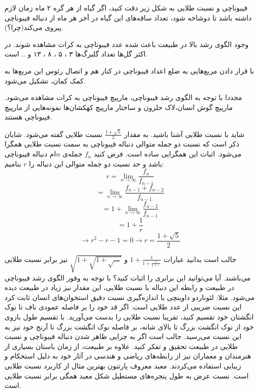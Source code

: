 \begin{EXTRA}{فیبوناچی و نسبت طلایی}
    \p
    به شکل زیر دقت کنید، اگر گیاه از هر گره ۲ ماه زمان لازم داشته باشد تا دوشاخه شود، تعداد ساقه‌های این گیاه در آخر هر ماه از دنباله فیبوناچی پیروی می‌کند(چرا؟).
    

    \p
    وجود الگوی رشد بالا در طبیعت باعث شده عدد فیبوناچی به کرات مشاهده شوند.
    در اکثر گل‌ها تعداد گلبرگ‌ها ۳ ، ۵ ، ۸ ، ۱۳ و .. است.


    \p
    با قرار دادن مربع‌هایی به ضلع اعداد فیبوناچی در کنار هم و اتصال رئوس این مربع‌ها به کمک کمان، تشکیل می‌شود.
    
    
    \p
    مجددا با توجه به الگوی رشد فیبوناچی، مارپیچ فیبوناچی به کرات مشاهده می‌شود.
    مارپیچ گوش انسان،لاک حلزون و ساختار مارپیچ کهکشان‌ها نمونه‌هایی از مارپیچ فیبوناچی هستند.
    
    
    \p
    شاید با نسبت طلایی آشنا باشید. به مقدار $\frac{1+\sqrt{5}}{2}$ نسبت طلایی گفته می‌شود.
    شایان ذکر است که نسبت دو جمله متوالی دنباله فیبوناچی به سمت نسبت طلایی همگرا می‌شود.
    اثبات این همگرایی ساده است. فرض کنید
    $f_n$
    جمله‌ی
    $n$ام
    دنباله فیبوناچی باشد و
    حد نسبت دو جمله متوالی این دنباله را
    $r$ بنامیم:
    $$r = \lim\limits_{n \to \infty} \frac{f_n}{f_{n-1}}$$
    $$= \lim\limits_{n \to \infty} \frac{f_{n-1}+f_{n-2}}{f_{n-1}}$$
    $$= 1 + \lim\limits_{n \to \infty} \frac{f_{n-2}}{f_{n-1}}$$
    $$= 1 + \frac{1}{r}$$
    $$\rightarrow r^2 - r - 1 = 0 \rightarrow r = \frac{1+\sqrt{5}}{2}$$

    \p
    جالب است بدانید عبارات
    $1+\frac{1}{1+\frac{1}{1+...}}$
    و
    $\sqrt{1+\sqrt{1+\sqrt{...}}}$
    نیز برابر نسبت طلایی می‌باشند.
    آیا می‌توانید این برابری را اثبات کنید؟
    \p
    با توجه به وفور الگوی رشد فیبوناچی در طبیعت و رابطه این دنباله با نسبت طلایی، این مقدار نیز زیاد در طبیعت دیده می‌شود.
    مثلا:
    لئوناردو داوینچی با اندازه‌گیری نسبت دقیق استخوان‌های انسان ثابت کرد این نسبت ضریبی از عدد طلایی است.
    اگر قد خود را بر فاصله عمودی ناف تا نوک انگشتان خود تقسیم کنید، تقریبا نسبت طلایی را بدست می‌آورید.
    با تقسیم طول بازوی خود از نوک انگشت بزرگ تا بالای شانه، بر فاصله نوک انگشت بزرگ تا آرنج خود نیز به این نسبت می‌رسید.
    جالب است اگر به چرایی ظاهر شدن دنباله فیبوناچی و نسبت طلایی در طبیعت تحقیق و تفکر کنید.
    \p
    علاوه بر طبیعت، از زمان باستان بسیاری از هنرمندان و معماران نیز از رابطه‌های ریاضی و هندسی در آثار خود به دلیل استحکام و زیبایی استفاده می‌کردند.
    معبد معروف پارتنون بهترین مثال از کاربرد نسبت طلایی است. نسبت عرض به طول پنجره‌های مستطیل شکل معبد همگی برابر نسبت طلایی است.

\end{EXTRA}
